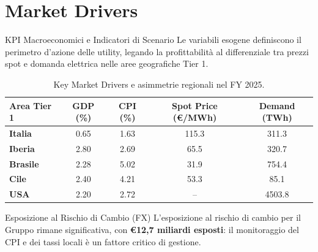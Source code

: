 
\section{Market Drivers}

\begin{frame}{KPI Macroeconomici e Indicatori di Scenario}
    Le variabili esogene definiscono il perimetro d'azione delle utility, legando la profittabilità al differenziale tra prezzi spot e domanda elettrica nelle aree geografiche Tier 1.
    \vspace{0.1cm}
    
    
    \begin{table}
        \centering
        \small
        \begin{tabular}{lcccc}
            \toprule
            \textbf{Area Tier 1} & \textbf{GDP (\%)} & \textbf{CPI (\%)} & \textbf{Spot Price (€/MWh)} & \textbf{Demand (TWh)} \\
            \midrule
            \textbf{Italia}  & 0.65 & 1.63 & 115.3 & 311.3 \\
            \textbf{Iberia}  & 2.80 & 2.69 & 65.5  & 320.7 \\
            \textbf{Brasile} & 2.28 & 5.02 & 31.9  & 754.4 \\
            \textbf{Cile}    & 2.40 & 4.21 & 53.3  & 85.1  \\
            \textbf{USA}     & 2.20 & 2.72 & --    & 4503.8 \\
            \bottomrule
        \end{tabular}
        \caption{Key Market Drivers e asimmetrie regionali nel FY 2025.}
    \end{table}
    \vspace{-0.1cm}
    \pause
    
    \begin{alertblock}{Esposizione al Rischio di Cambio (FX)}
        L'esposizione al rischio di cambio per il Gruppo rimane significativa, con \textbf{€12,7 miliardi esposti}: il monitoraggio del CPI e dei tassi locali è un fattore critico di gestione.
    \end{alertblock}
\end{frame}


